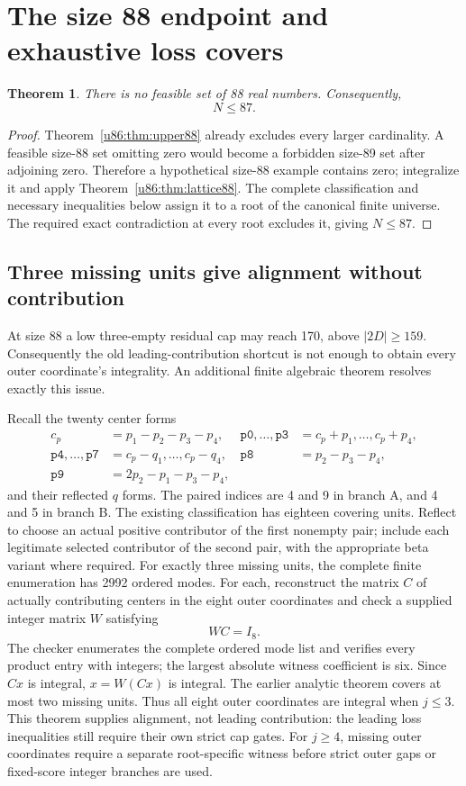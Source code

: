 \documentclass[11pt,a4paper]{article}
\newtheorem{theorem}{Theorem}[section]
\theoremstyle{remark}
\begin{document}
\section{The size 88 endpoint and exhaustive loss covers}\label{u86:sec:upper87}
\begin{theorem}\label{u86:thm:upper87}
There is no feasible set of 88 real numbers. Consequently,
\[
 \boxed{N\le87.}
\]
\end{theorem}
\begin{proof}
Theorem~\ref{u86:thm:upper88} already excludes every larger cardinality.
A feasible size-88 set omitting zero would become a forbidden size-89
set after adjoining zero. Therefore a hypothetical size-88 example
contains zero; integralize it and apply Theorem~\ref{u86:thm:lattice88}.
The complete classification and necessary inequalities below assign it
to a root of the canonical finite universe.
The required exact contradiction at every root excludes
it, giving $N\le87$.

\end{proof}

\subsection{Three missing units give alignment without contribution}
At size 88 a low three-empty residual cap may reach 170, above
$|2D|\ge159$. Consequently the old leading-contribution shortcut is
not enough to obtain every outer coordinate's integrality.
An additional finite algebraic theorem resolves exactly this issue.

Recall the twenty center forms
\begin{align*}
 c_p&=p_1-p_2-p_3-p_4,&
 \mathtt{p0},\ldots,\mathtt{p3}&=c_p+p_1,\ldots,c_p+p_4,\\
 \mathtt{p4},\ldots,\mathtt{p7}&=c_p-q_1,\ldots,c_p-q_4,&
 \mathtt{p8}&=p_2-p_3-p_4,\\
 \mathtt{p9}&=2p_2-p_1-p_3-p_4,
\end{align*}
and their reflected $q$ forms. The paired indices are 4 and 9 in
branch A, and 4 and 5 in branch B.
The existing classification has eighteen covering units. Reflect to
choose an actual positive contributor of the first nonempty pair;
include each legitimate selected contributor of the second pair, with
the appropriate beta variant where required.
For exactly three missing units, the complete finite enumeration has 2992
ordered modes. For each, reconstruct the matrix $C$ of actually
contributing centers in the eight outer coordinates and check a supplied
integer matrix $W$ satisfying
\[
 WC=I_8.
\]
The checker enumerates the complete ordered mode list and verifies
every product entry with integers; the largest absolute witness
coefficient is six. Since $Cx$ is integral, $x=W(Cx)$ is integral.
The earlier analytic theorem covers at most two missing units.
Thus all eight outer coordinates are integral when $j\le3$.
This theorem supplies alignment, not leading contribution: the
leading loss inequalities still require their own strict cap gates.
For $j\ge4$, missing outer coordinates require a separate root-specific
witness before strict outer gaps or fixed-score integer branches are used.
\end{document}

